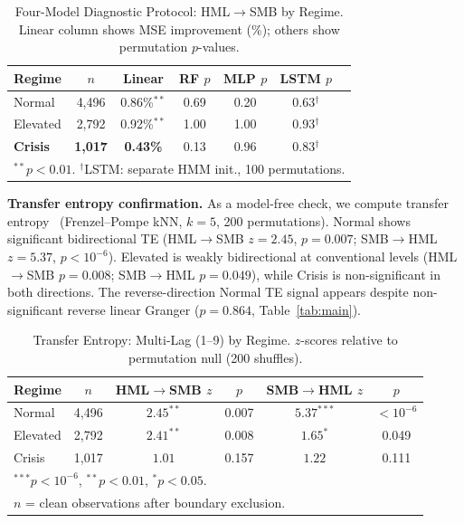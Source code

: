 \documentclass{uai2026}
\begin{document}
\begin{table}[t]
\centering
\caption[Four-model diagnostics]{Four-Model Diagnostic Protocol: HML$\to$SMB by Regime.
Linear column shows MSE improvement (\%); others show permutation $p$-values.}
\label{tab:neural}
\small
\begin{tabular}{lcccccc}
\toprule
Regime & $n$ & Linear & RF $p$ & MLP $p$ & LSTM $p$ \\
\midrule
Normal & 4,496 & 0.86\%$^{**}$ & 0.69 & 0.20 & 0.63$^\dagger$ \\
Elevated & 2,792 & 0.92\%$^{**}$ & 1.00 & 1.00 & 0.93$^\dagger$ \\
\textbf{Crisis} & \textbf{1,017} & \textbf{0.43\%} & 0.13 & 0.96 & 0.83$^\dagger$ \\
\bottomrule
\multicolumn{7}{l}{\footnotesize $^{**}p < 0.01$. $^\dagger$LSTM: separate HMM init., 100 permutations.} \\
\end{tabular}
\end{table}

\textbf{Transfer entropy confirmation.}
As a model-free check, we compute transfer entropy~\cite{schreiber2000measuring}
(Frenzel--Pompe kNN, $k=5$, 200 permutations).
Normal shows significant bidirectional TE (HML$\to$SMB $z = 2.45$, $p = 0.007$;
SMB$\to$HML $z = 5.37$, $p < 10^{-6}$). Elevated is weakly bidirectional at
conventional levels (HML$\to$SMB $p = 0.008$; SMB$\to$HML $p = 0.049$), while
Crisis is non-significant in both directions. The reverse-direction Normal TE
signal appears despite non-significant reverse linear Granger
($p = 0.864$, Table~\ref{tab:main}).

\begin{table}[t]
\centering
\caption{Transfer Entropy: Multi-Lag (1--9) by Regime.
$z$-scores relative to permutation null (200 shuffles).}
\label{tab:te}
\scriptsize
\begin{tabular}{@{}lccccc@{}}
\toprule
Regime & $n$ & HML$\to$SMB $z$ & $p$ & SMB$\to$HML $z$ & $p$ \\
\midrule
Normal & 4,496 & $2.45^{**}$ & 0.007 & $5.37^{***}$ & $< 10^{-6}$ \\
Elevated & 2,792 & $2.41^{**}$ & 0.008 & $1.65^{*}$ & 0.049 \\
Crisis & 1,017 & $1.01$ & 0.157 & $1.22$ & 0.111 \\
\bottomrule
\multicolumn{6}{l}{\footnotesize $^{***}p < 10^{-6}$, $^{**}p < 0.01$, $^{*}p < 0.05$.} \\
\multicolumn{6}{l}{\footnotesize $n$ = clean observations after boundary exclusion.} \\
\end{tabular}
\end{table}
\end{document}
